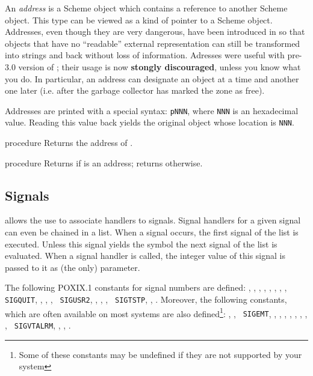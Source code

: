 \label{addresses}
An {\em address} is a Scheme object which contains a reference to
another Scheme object. This type can be viewed as a kind of pointer to
a Scheme object.  Addresses, even though they are very dangerous, have
been introduced in {\stk} so that objects that have no ``readable''
external representation can still be transformed into strings and back
without loss of information. Adresses were useful with pre-3.0 version
of {\stk}; their usage is now {\bf stongly discouraged}, unless you know what you
do. In particular, an address can designate an object at a time and
another one later (i.e. after the garbage collector has marked the zone
as free).

Addresses are printed with a special syntax: {\tt {\sharpsign}pNNN},
where {\tt NNN} is an hexadecimal value. Reading this value back
yields the original object whose location is {\tt NNN}.

\begin{entry}{%
 {procedure}}
\saut
Returns the address of .
\end{entry}

\begin{entry}{%
 {procedure}}
\saut
Returns {\schtrue} if  is an address; returns {\schfalse} otherwise.
\end{entry}

\subsection{Signals}

\label{signals}
{\stk} allows the use to associate handlers to signals. Signal
handlers for a given signal can even be chained in a list. When a
signal occurs, the first signal of the list is executed. Unless this
signal yields the symbol  the next signal of the list is
evaluated. When a signal handler is called, the integer value of this
signal is passed to it as (the only) parameter.

The following POXIX.1 constants for signal numbers
are defined: , , , ,
, , , , {\tt
  SIGQUIT}, , , , {\tt
  SIGUSR2}, , , , {\tt
  SIGTSTP}, , .  Moreover, the following
constants, which are often available on most systems are also
defined\footnote{Some of these constants may be undefined if they are
  not supported by your system}: , , {\tt
  SIGEMT}, , , , ,
, , , , {\tt
  SIGVTALRM}, , , .

